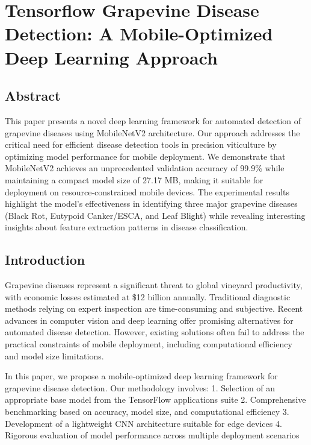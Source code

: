 \documentclass[
]{article}
\author{}
\date{\vspace{-2.5em}}
\begin{document}
\section{Tensorflow Grapevine Disease Detection: A Mobile-Optimized Deep
Learning
Approach}\label{tensorflow-grapevine-disease-detection-a-mobile-optimized-deep-learning-approach}

\subsection{Abstract}\label{abstract}

This paper presents a novel deep learning framework for automated
detection of grapevine diseases using MobileNetV2 architecture. Our
approach addresses the critical need for efficient disease detection
tools in precision viticulture by optimizing model performance for
mobile deployment. We demonstrate that MobileNetV2 achieves an
unprecedented validation accuracy of 99.9\% while maintaining a compact
model size of 27.17 MB, making it suitable for deployment on
resource-constrained mobile devices. The experimental results highlight
the model's effectiveness in identifying three major grapevine diseases
(Black Rot, Eutypoid Canker/ESCA, and Leaf Blight) while revealing
interesting insights about feature extraction patterns in disease
classification.

\subsection{Introduction}\label{introduction}

Grapevine diseases represent a significant threat to global vineyard
productivity, with economic losses estimated at \$12 billion annually.
Traditional diagnostic methods relying on expert inspection are
time-consuming and subjective. Recent advances in computer vision and
deep learning offer promising alternatives for automated disease
detection. However, existing solutions often fail to address the
practical constraints of mobile deployment, including computational
efficiency and model size limitations.

In this paper, we propose a mobile-optimized deep learning framework for
grapevine disease detection. Our methodology involves: 1. Selection of
an appropriate base model from the TensorFlow applications suite 2.
Comprehensive benchmarking based on accuracy, model size, and
computational efficiency 3. Development of a lightweight CNN
architecture suitable for edge devices 4. Rigorous evaluation of model
performance across multiple deployment scenarios
\end{document}
